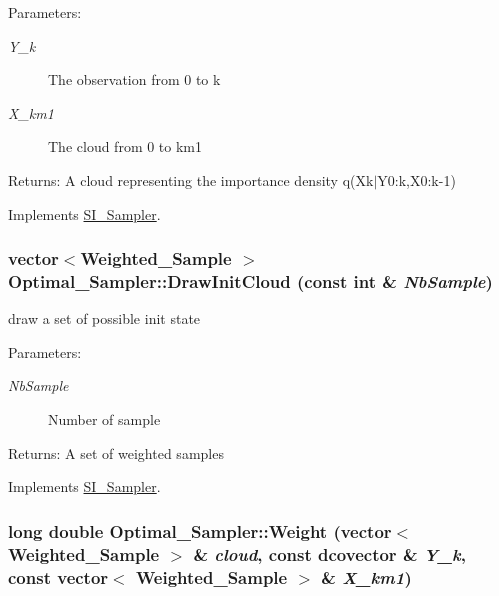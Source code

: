 \begin{Desc}
\item[Parameters:]
\begin{description}
\item[{\em Y\_\-k}]The observation from 0 to k \item[{\em X\_\-km1}]The cloud from 0 to km1\end{description}
\end{Desc}
\begin{Desc}
\item[Returns:]A cloud representing the importance density q(Xk$|$Y0:k,X0:k-1) \end{Desc}


Implements \hyperlink{class_s_i___sampler_62bf57181aeb5981426a71a7bf01c3e9}{SI\_\-Sampler}.\hypertarget{class_optimal___sampler_d1f49e39bf83898c19c044a3874c6930}{
\subsubsection[{DrawInitCloud}]{\setlength{\rightskip}{0pt plus 5cm}vector$<${\bf Weighted\_\-Sample} $>$ Optimal\_\-Sampler::DrawInitCloud (const int \& {\em NbSample})}}
\label{class_optimal___sampler_d1f49e39bf83898c19c044a3874c6930}


draw a set of possible init state 

\begin{Desc}
\item[Parameters:]
\begin{description}
\item[{\em NbSample}]Number of sample\end{description}
\end{Desc}
\begin{Desc}
\item[Returns:]A set of weighted samples \end{Desc}


Implements \hyperlink{class_s_i___sampler_3fbedf1ce189168da5608861d5a3289e}{SI\_\-Sampler}.\hypertarget{class_optimal___sampler_376a6addc54dd14aee7f1367c183e100}{
\subsubsection[{Weight}]{\setlength{\rightskip}{0pt plus 5cm}long double Optimal\_\-Sampler::Weight (vector$<$ {\bf Weighted\_\-Sample} $>$ \& {\em cloud}, \/  const dcovector \& {\em Y\_\-k}, \/  const vector$<$ {\bf Weighted\_\-Sample} $>$ \& {\em X\_\-km1})}}
\label{class_optimal___sampler_376a6addc54dd14aee7f1367c183e100}


